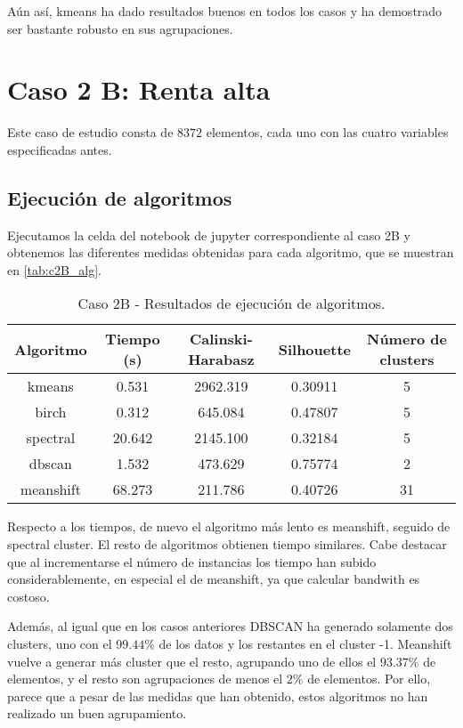 Aún así, kmeans ha dado resultados buenos en todos los casos y ha demostrado ser bastante robusto en sus agrupaciones.



\section{Caso 2 B: Renta alta}

Este caso de estudio consta de $8372$ elementos, cada uno con las cuatro variables especificadas antes.

\subsection{Ejecución de algoritmos}

Ejecutamos la celda del notebook de jupyter correspondiente al caso 2B y obtenemos las diferentes medidas obtenidas para cada algoritmo, que se muestran en \eqref{tab:c2B_alg}.

\begin{table}[H]
\centering
\caption{Caso 2B - Resultados de ejecución de algoritmos.}
\label{tab:c2_alg}
\begin{tabular}{ccccc}
\toprule
 Algoritmo & Tiempo (s) & Calinski-Harabasz & Silhouette & Número de clusters \\
\midrule
kmeans & 0.531 & 2962.319 & 0.30911 & 5 \\
birch & 0.312 & 645.084 & 0.47807 & 5 \\
spectral & 20.642 & 2145.100 & 0.32184 & 5 \\
dbscan & 1.532 & 473.629 & 0.75774 & 2 \\
meanshift & 68.273 & 211.786 & 0.40726 & 31 \\
\bottomrule
\end{tabular}
\end{table}

Respecto a los tiempos, de nuevo el algoritmo más lento es meanshift, seguido de spectral cluster. El resto de algoritmos obtienen tiempo similares. Cabe destacar que al incrementarse el número de instancias los tiempo han subido considerablemente, en especial el de meanshift, ya que calcular bandwith es costoso.

Además, al igual que en los casos anteriores DBSCAN ha generado solamente dos clusters, uno con el $99.44\%$ de los datos y los restantes en el cluster -1. Meanshift vuelve a generar más cluster que el resto, agrupando uno de ellos el $93.37\%$ de elementos, y el resto son  agrupaciones de menos el $2\%$ de elementos. Por ello, parece que a pesar de las medidas que han obtenido, estos algoritmos no han realizado un buen agrupamiento.

